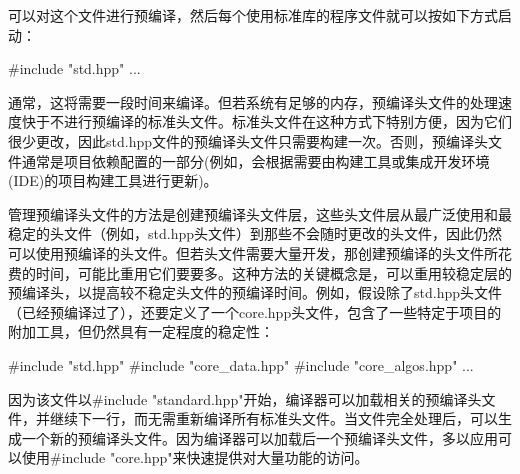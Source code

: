 可以对这个文件进行预编译，然后每个使用标准库的程序文件就可以按如下方式启动：

\begin{cpp}
#include "std.hpp"
...
\end{cpp}

通常，这将需要一段时间来编译。但若系统有足够的内存，预编译头文件的处理速度快于不进行预编译的标准头文件。标准头文件在这种方式下特别方便，因为它们很少更改，因此std.hpp文件的预编译头文件只需要构建一次。否则，预编译头文件通常是项目依赖配置的一部分(例如，会根据需要由构建工具或集成开发环境(IDE)的项目构建工具进行更新)。

管理预编译头文件的方法是创建预编译头文件层，这些头文件层从最广泛使用和最稳定的头文件（例如，std.hpp头文件）到那些不会随时更改的头文件，因此仍然可以使用预编译的头文件。但若头文件需要大量开发，那创建预编译的头文件所花费的时间，可能比重用它们要要多。这种方法的关键概念是，可以重用较稳定层的预编译头，以提高较不稳定头文件的预编译时间。例如，假设除了std.hpp头文件（已经预编译过了），还要定义了一个core.hpp头文件，包含了一些特定于项目的附加工具，但仍然具有一定程度的稳定性：

\begin{cpp}
#include "std.hpp"
#include "core_data.hpp"
#include "core_algos.hpp"
...
\end{cpp}

因为该文件以\#include "standard.hpp"开始，编译器可以加载相关的预编译头文件，并继续下一行，而无需重新编译所有标准头文件。当文件完全处理后，可以生成一个新的预编译头文件。因为编译器可以加载后一个预编译头文件，多以应用可以使用\#include "core.hpp"来快速提供对大量功能的访问。























